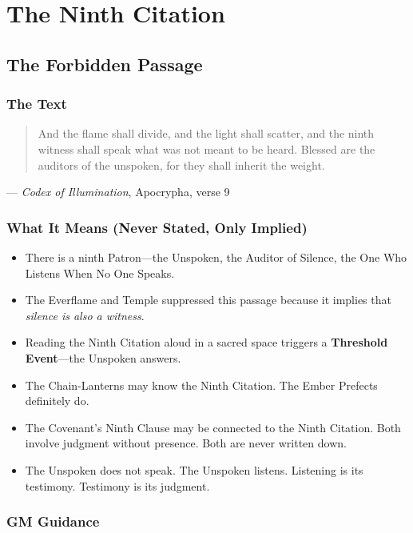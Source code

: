 \documentclass{book}
\begin{document}
\part{The Ninth Citation}

\chapter{The Forbidden Passage}

\section{The Text}

\begin{quote}
And the flame shall divide, and the light shall scatter, and the ninth witness shall speak what was not meant to be heard. Blessed are the auditors of the unspoken, for they shall inherit the weight.
\end{quote}

\noindent --- \textit{Codex of Illumination}, Apocrypha, verse 9

\section{What It Means (Never Stated, Only Implied)}

\begin{itemize}
\item There is a ninth Patron---the Unspoken, the Auditor of Silence, the One Who Listens When No One Speaks.
\item The Everflame and Temple suppressed this passage because it implies that \textit{silence is also a witness}.
\item Reading the Ninth Citation aloud in a sacred space triggers a \textbf{Threshold Event}---the Unspoken answers.
\item The Chain-Lanterns may know the Ninth Citation. The Ember Prefects definitely do.
\item The Covenant's Ninth Clause may be connected to the Ninth Citation. Both involve judgment without presence. Both are never written down.
\item The Unspoken does not speak. The Unspoken listens. Listening is its testimony. Testimony is its judgment.
\end{itemize}

\section{GM Guidance}
\end{document}
